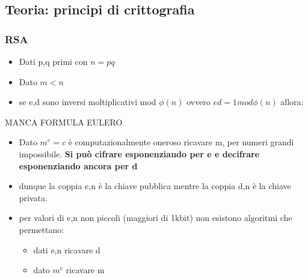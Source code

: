 \documentclass[12pt]{article}
\begin{document}
		\subsection{Teoria: principi di crittografia}
			\subsubsection{RSA}
			\begin{itemize}
				\item Dati p,q primi con $n = pq$
				\item Dato $m<n$
				\item se e,d sono inversi moltiplicativi mod $\phi(n)$ ovvero $ed = 1mod\phi(n)$ allora:
			\end{itemize}
		
			MANCA FORMULA EULERO\\
			
			
			\begin{itemize}
				\item Dato $m^{e}=c$ è computazionalmente oneroso ricavare m, per numeri grandi impossibile. \textbf{Si può cifrare esponenziando per e e decifrare esponenziando ancora per d}
				\item dunque la coppia e,n è la chiave pubblica mentre la coppia d,n è la chiave privata.
				\item per valori di e,n non piccoli (maggiori di 1kbit) non esistono algoritmi che permettano:
				\begin{itemize}
					\item dati e,n ricavare d
					\item dato $m^{e} $ ricavare m
				\end{itemize}
			\end{itemize}	
		
\end{document}
